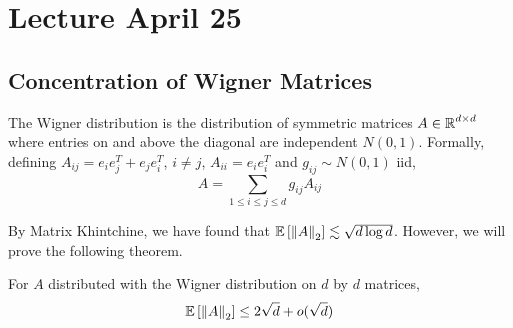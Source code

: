 

\section{Lecture April 25}

\subsection{Concentration of Wigner Matrices}

\begin{definition}
    The Wigner distribution is the distribution of symmetric matrices $A \in \operatorname{\mathbb{R}}^{d\times d}$
    where entries on and above the diagonal are independent $N(0, 1)$.
    Formally, defining $A_{ij} = e_i e_j^T + e_j e_i^T$, $i \neq j$, $A_{ii} = e_i e_i^T$
    and $g_{ij} \sim N(0, 1)$ iid,
    \[ A = \sum_{1 \le i \le j \le d} g_{ij} A_{ij} \]
\end{definition}

By Matrix Khintchine, we have found that $\mathbb{E}\left[ \norm{A}_2 \right] \lesssim \sqrt{d \log d}$.
However, we will prove the following theorem.
\begin{theorem}
    For $A$ distributed with the Wigner distribution on $d$ by $d$ matrices,
    \[ \mathbb{E}\left[ \norm{A}_2 \right] \le 2\sqrt{d} + o(\sqrt{d}) \]
\end{theorem}

